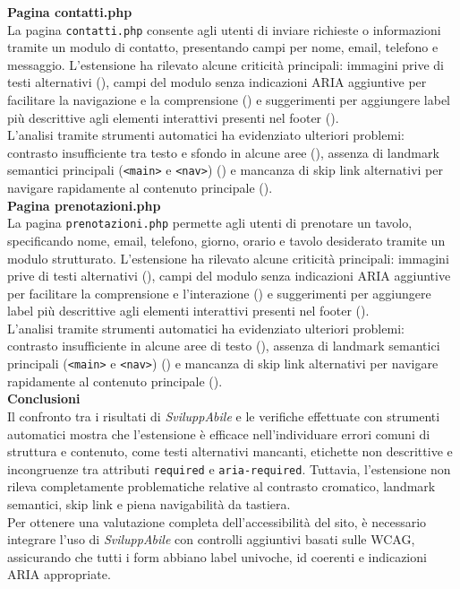 \noindent \textbf{Pagina contatti.php}\\
La pagina \texttt{contatti.php} consente agli utenti di inviare richieste o informazioni tramite un modulo di contatto, presentando campi per nome, email, telefono e messaggio. L’estensione ha rilevato alcune criticità principali: immagini prive di testi alternativi ({}), campi del modulo senza indicazioni ARIA aggiuntive per facilitare la navigazione e la comprensione ({}) e suggerimenti per aggiungere label più descrittive agli elementi interattivi presenti nel footer ({}).\\
L’analisi tramite strumenti automatici ha evidenziato ulteriori problemi: contrasto insufficiente tra testo e sfondo in alcune aree ({}), assenza di landmark semantici principali (\texttt{<main>} e \texttt{<nav>}) ({}) e mancanza di skip link alternativi per navigare rapidamente al contenuto principale ({}).\\

\noindent \textbf{Pagina prenotazioni.php}\\
La pagina \texttt{prenotazioni.php} permette agli utenti di prenotare un tavolo, specificando nome, email, telefono, giorno, orario e tavolo desiderato tramite un modulo strutturato. L’estensione ha rilevato alcune criticità principali: immagini prive di testi alternativi ({}), campi del modulo senza indicazioni ARIA aggiuntive per facilitare la comprensione e l’interazione ({}) e suggerimenti per aggiungere label più descrittive agli elementi interattivi presenti nel footer ({}).\\
L’analisi tramite strumenti automatici ha evidenziato ulteriori problemi: contrasto insufficiente in alcune aree di testo ({}), assenza di landmark semantici principali (\texttt{<main>} e \texttt{<nav>}) ({}) e mancanza di skip link alternativi per navigare rapidamente al contenuto principale ({}).\\

\noindent \textbf{Conclusioni}\\
Il confronto tra i risultati di \textit{SviluppAbile} e le verifiche effettuate con strumenti automatici mostra che l’estensione è efficace nell’individuare errori comuni di struttura e contenuto, come testi alternativi mancanti, etichette non descrittive e incongruenze tra attributi \texttt{required} e \texttt{aria-required}. Tuttavia, l’estensione non rileva completamente problematiche relative al contrasto cromatico, landmark semantici, skip link e piena navigabilità da tastiera.\\
Per ottenere una valutazione completa dell’accessibilità del sito, è necessario integrare l’uso di \textit{SviluppAbile} con controlli aggiuntivi basati sulle WCAG, assicurando che tutti i form abbiano label univoche, id coerenti e indicazioni ARIA appropriate.


